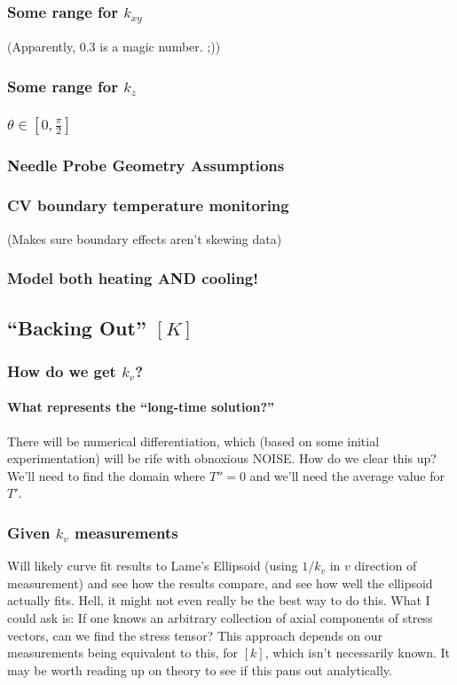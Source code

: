 \documentclass[10pt, letterpaper]{article}
\begin{document}
        \subsubsection{Some range for \(k_{xy}\)}
          (Apparently, 0.3 is a magic number. ;))
        \subsubsection{Some range for \(k_z\)}
        \subsubsection{\(\theta \in [0, \frac{\pi}{2} ]\)}
        \subsubsection{Needle Probe Geometry Assumptions}
        \subsubsection{CV boundary temperature monitoring}
          (Makes sure boundary effects aren't skewing data)
        \subsubsection{Model both heating AND cooling!}
      \subsection{``Backing Out'' \([K]\)}
        \subsubsection{How do we get \(k_v\)?}
          \paragraph{What represents the ``long-time solution?''}
            There will be numerical differentiation, which (based on some initial experimentation) will be rife with obnoxious NOISE. How do we clear this up? We'll need to find the domain where \(T'' = 0\) and we'll need the average value for \(T'\).
        \subsubsection{Given \(k_v\) measurements}
          Will likely curve fit results to Lame's Ellipsoid (using \(1/k_v\) in \(v\) direction of measurement) and see how the results compare, and see how well the ellipsoid actually fits. Hell, it might not even really be the best way to do this.
          What I could ask is: If one knows an arbitrary collection of axial components of stress vectors, can we find the stress tensor? This approach depends on our measurements being equivalent to this, for \([k]\), which isn't necessarily known. It may be worth reading up on theory to see if this pans out analytically.
\end{document}
